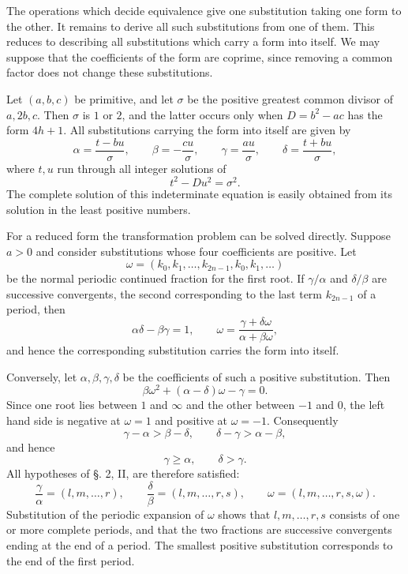 \documentclass[11pt]{article}
\begin{document}
The operations which decide equivalence give one substitution taking one form to the other. It remains to derive all such substitutions from one of them. This reduces to describing all substitutions which carry a form into itself. We may suppose that the coefficients of the form are coprime, since removing a common factor does not change these substitutions.

Let $(a,b,c)$ be primitive, and let $\sigma$ be the positive greatest common divisor of $a,2b,c$. Then $\sigma$ is $1$ or $2$, and the latter occurs only when $D=b^2-ac$ has the form $4h+1$. All substitutions carrying the form into itself are given by
\[
 \alpha=\frac{t-bu}{\sigma},
 \qquad
 \beta=-\frac{cu}{\sigma},
 \qquad
 \gamma=\frac{au}{\sigma},
 \qquad
 \delta=\frac{t+bu}{\sigma},
\]
where $t,u$ run through all integer solutions of
\[
 t^2-Du^2=\sigma^2.
\]
The complete solution of this indeterminate equation is easily obtained from its solution in the least positive numbers.

For a reduced form the transformation problem can be solved directly. Suppose $a>0$ and consider substitutions whose four coefficients are positive. Let
\[
 \omega=(k_0,k_1,\ldots,k_{2n-1},k_0,k_1,\ldots)
\]
be the normal periodic continued fraction for the first root. If $\gamma/\alpha$ and $\delta/\beta$ are successive convergents, the second corresponding to the last term $k_{2n-1}$ of a period, then
\[
 \alpha\delta-\beta\gamma=1,
 \qquad
 \omega=\frac{\gamma+\delta\omega}{\alpha+\beta\omega},
\]
and hence the corresponding substitution carries the form into itself.

Conversely, let $\alpha,\beta,\gamma,\delta$ be the coefficients of such a positive substitution. Then
\[
 \beta\omega^2+(\alpha-
\delta)\omega-
\gamma=0.
\]
Since one root lies between $1$ and $\infty$ and the other between $-1$ and $0$, the left hand side is negative at $\omega=1$ and positive at $\omega=-1$. Consequently
\[
 \gamma-
\alpha>\beta-
\delta,
 \qquad
 \delta-
\gamma>\alpha-
\beta,
\]
and hence
\[
 \gamma\geq\alpha,
 \qquad
 \delta>\gamma.
\]
All hypotheses of \S. 2, II, are therefore satisfied:
\[
 \frac{\gamma}{\alpha}=(l,m,\ldots,r),
 \qquad
 \frac{\delta}{\beta}=(l,m,\ldots,r,s),
 \qquad
 \omega=(l,m,\ldots,r,s,
\omega).
\]
Substitution of the periodic expansion of $\omega$ shows that $l,m,\ldots,r,s$ consists of one or more complete periods, and that the two fractions are successive convergents ending at the end of a period. The smallest positive substitution corresponds to the end of the first period.
\end{document}
